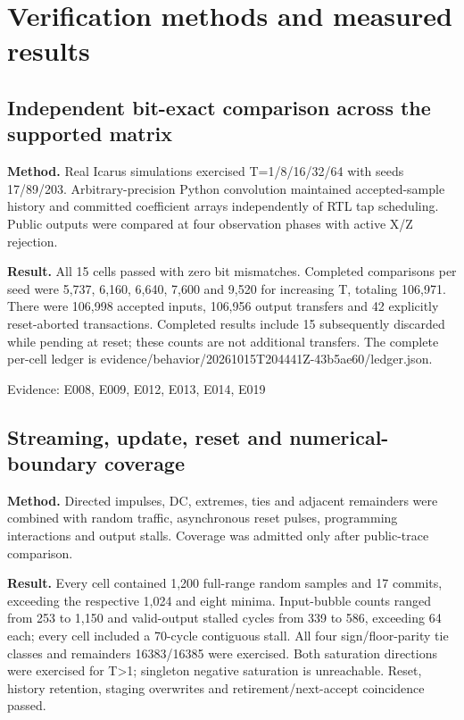 \documentclass[11pt,a4paper]{article}
\begin{document}
\section{Verification methods and measured results}

\subsection{Independent bit-exact comparison across the supported matrix}

\textbf{Method.} Real Icarus simulations exercised T=\allowbreak{}1/\allowbreak{}8/\allowbreak{}16/\allowbreak{}32/\allowbreak{}64 with seeds 17/\allowbreak{}89/\allowbreak{}203. Arbitrary-precision Python convolution maintained accepted-sample history and committed coefficient arrays independently of RTL tap scheduling. Public outputs were compared at four observation phases with active X/\allowbreak{}Z rejection.

\textbf{Result.} All 15 cells passed with zero bit mismatches. Completed comparisons per seed were 5,\allowbreak{}737,\allowbreak{} 6,\allowbreak{}160,\allowbreak{} 6,\allowbreak{}640,\allowbreak{} 7,\allowbreak{}600 and 9,\allowbreak{}520 for increasing T,\allowbreak{} totaling 106,\allowbreak{}971. There were 106,\allowbreak{}998 accepted inputs,\allowbreak{} 106,\allowbreak{}956 output transfers and 42 explicitly reset-aborted transactions. Completed results include 15 subsequently discarded while pending at reset; these counts are not additional transfers. The complete per-cell ledger is evidence/\allowbreak{}behavior/\allowbreak{}20261015T204441Z-43b5ae60/\allowbreak{}ledger.json.

{\small Evidence: E008,\allowbreak{} E009,\allowbreak{} E012,\allowbreak{} E013,\allowbreak{} E014,\allowbreak{} E019}

\subsection{Streaming,\allowbreak{} update,\allowbreak{} reset and numerical-boundary coverage}

\textbf{Method.} Directed impulses,\allowbreak{} DC,\allowbreak{} extremes,\allowbreak{} ties and adjacent remainders were combined with random traffic,\allowbreak{} asynchronous reset pulses,\allowbreak{} programming interactions and output stalls. Coverage was admitted only after public-trace comparison.

\textbf{Result.} Every cell contained 1,\allowbreak{}200 full-range random samples and 17 commits,\allowbreak{} exceeding the respective 1,\allowbreak{}024 and eight minima. Input-bubble counts ranged from 253 to 1,\allowbreak{}150 and valid-output stalled cycles from 339 to 586,\allowbreak{} exceeding 64 each; every cell included a 70-cycle contiguous stall. All four sign/\allowbreak{}floor-parity tie classes and remainders 16383/\allowbreak{}16385 were exercised. Both saturation directions were exercised for T>1; singleton negative saturation is unreachable. Reset,\allowbreak{} history retention,\allowbreak{} staging overwrites and retirement/\allowbreak{}next-accept coincidence passed.
\end{document}
